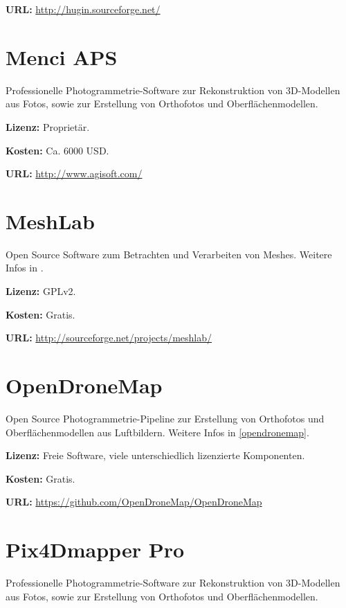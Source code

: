 {\textbf{URL:} \url{http://hugin.sourceforge.net/}


\section{Menci APS}

Professionelle Photogrammetrie-Software zur Rekonstruktion von 3D-Modellen aus
Fotos, sowie zur Erstellung von Orthofotos und Oberflächenmodellen.

\textbf{Lizenz:} Proprietär.

\textbf{Kosten:} Ca. 6000 USD.

\textbf{URL:} \url{http://www.agisoft.com/}


\section{MeshLab}

Open Source Software zum Betrachten und Verarbeiten von Meshes. Weitere Infos in
\label{workflow:mesh-generating}.

\textbf{Lizenz:} GPLv2.

\textbf{Kosten:} Gratis.

\textbf{URL:} \url{http://sourceforge.net/projects/meshlab/}


\section{OpenDroneMap}

Open Source Photogrammetrie-Pipeline zur Erstellung von Orthofotos und
Oberflächenmodellen aus Luftbildern. Weitere Infos in \autoref{opendronemap}.

\textbf{Lizenz:} Freie Software, viele unterschiedlich lizenzierte Komponenten.

\textbf{Kosten:} Gratis.

\textbf{URL:} \url{https://github.com/OpenDroneMap/OpenDroneMap}


\section{Pix4Dmapper Pro}

Professionelle Photogrammetrie-Software zur Rekonstruktion von 3D-Modellen aus
Fotos, sowie zur Erstellung von Orthofotos und Oberflächenmodellen.

}
